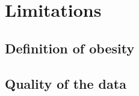\section{Limitations}
\label{sec:limitations}

\subsection{Definition of obesity}
\label{sub:definition_of_obesity}






\subsection{Quality of the data}
\label{sub:quality_of_the_data}













